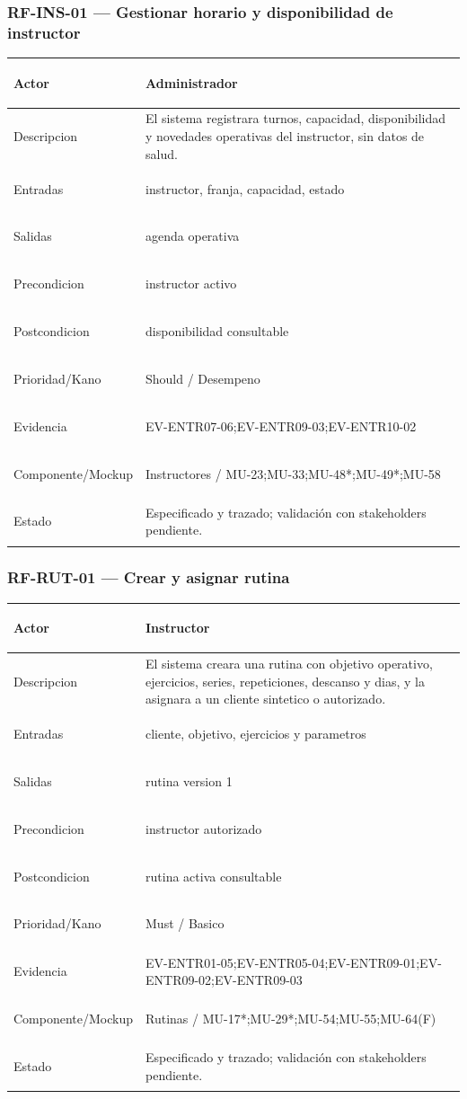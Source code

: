 \documentclass[11pt,a4paper,twoside]{article}
\begin{document}
\subsubsection{RF-INS-01 — Gestionar horario y disponibilidad de instructor}
\begingroup
\renewcommand{\arraystretch}{1.12}
\setlength{\tabcolsep}{5pt}
\begin{tabularx}{\textwidth}{|>{\bfseries\raggedright\arraybackslash}p{3.35cm}|>{\raggedright\arraybackslash}X|}
\hline
Actor & Administrador \\ \hline
Descripcion & El sistema registrara turnos, capacidad, disponibilidad y novedades operativas del instructor, sin datos de salud. \\ \hline
Entradas & instructor, franja, capacidad, estado \\ \hline
Salidas & agenda operativa \\ \hline
Precondicion & instructor activo \\ \hline
Postcondicion & disponibilidad consultable \\ \hline
Prioridad/Kano & Should / Desempeno \\ \hline
Evidencia & EV-ENTR07-06;EV-ENTR09-03;EV-ENTR10-02 \\ \hline
Componente/Mockup & Instructores / MU-23;MU-33;MU-48*;MU-49*;MU-58 \\ \hline
Estado & Especificado y trazado; validación con stakeholders pendiente. \\ \hline
\end{tabularx}
\endgroup

\subsubsection{RF-RUT-01 — Crear y asignar rutina}
\begingroup
\renewcommand{\arraystretch}{1.12}
\setlength{\tabcolsep}{5pt}
\begin{tabularx}{\textwidth}{|>{\bfseries\raggedright\arraybackslash}p{3.35cm}|>{\raggedright\arraybackslash}X|}
\hline
Actor & Instructor \\ \hline
Descripcion & El sistema creara una rutina con objetivo operativo, ejercicios, series, repeticiones, descanso y dias, y la asignara a un cliente sintetico o autorizado. \\ \hline
Entradas & cliente, objetivo, ejercicios y parametros \\ \hline
Salidas & rutina version 1 \\ \hline
Precondicion & instructor autorizado \\ \hline
Postcondicion & rutina activa consultable \\ \hline
Prioridad/Kano & Must / Basico \\ \hline
Evidencia & EV-ENTR01-05;EV-ENTR05-04;EV-ENTR09-01;EV-ENTR09-02;EV-ENTR09-03 \\ \hline
Componente/Mockup & Rutinas / MU-17*;MU-29*;MU-54;MU-55;MU-64(F) \\ \hline
Estado & Especificado y trazado; validación con stakeholders pendiente. \\ \hline
\end{tabularx}
\endgroup
\end{document}
